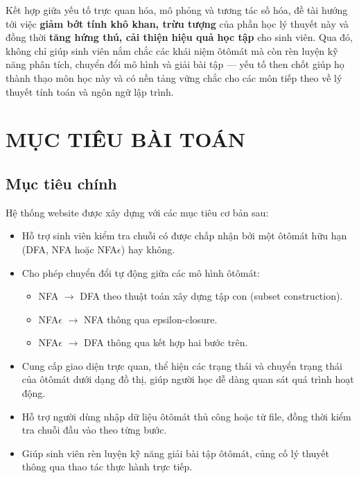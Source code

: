 \documentclass[12pt,a4paper]{report}
\begin{document}
Kết hợp giữa yếu tố trực quan hóa, mô phỏng và tương tác số hóa, đề tài hướng tới việc \textbf{giảm bớt tính khô khan, trừu tượng} của phần học lý thuyết này và đồng thời \textbf{tăng hứng thú, cải thiện hiệu quả học tập} cho sinh viên. Qua đó, không chỉ giúp sinh viên nắm chắc các khái niệm ôtômát mà còn rèn luyện kỹ năng phân tích, chuyển đổi mô hình và giải bài tập — yếu tố then chốt giúp họ thành thạo môn học này và có nền tảng vững chắc cho các môn tiếp theo về lý thuyết tính toán và ngôn ngữ lập trình.

\newpage
\chapter{MỤC TIÊU BÀI TOÁN}

\section{Mục tiêu chính}
Hệ thống website được xây dựng với các mục tiêu cơ bản sau:
\begin{itemize}
  \item Hỗ trợ sinh viên kiểm tra chuỗi có được chấp nhận bởi một ôtômát hữu hạn (DFA, NFA hoặc NFA$\epsilon$) hay không.
  \item Cho phép chuyển đổi tự động giữa các mô hình ôtômát:
    \begin{itemize}
      \item NFA $\rightarrow$ DFA theo thuật toán xây dựng tập con (subset construction).
      \item NFA$\epsilon$ $\rightarrow$ NFA thông qua epsilon-closure.
      \item NFA$\epsilon$ $\rightarrow$ DFA thông qua kết hợp hai bước trên.
    \end{itemize}
  \item Cung cấp giao diện trực quan, thể hiện các trạng thái và chuyển trạng thái của ôtômát dưới dạng đồ thị, giúp người học dễ dàng quan sát quá trình hoạt động.
  \item Hỗ trợ người dùng nhập dữ liệu ôtômát thủ công hoặc từ file, đồng thời kiểm tra chuỗi đầu vào theo từng bước.
  \item Giúp sinh viên rèn luyện kỹ năng giải bài tập ôtômát, củng cố lý thuyết thông qua thao tác thực hành trực tiếp.
\end{itemize}
\end{document}
